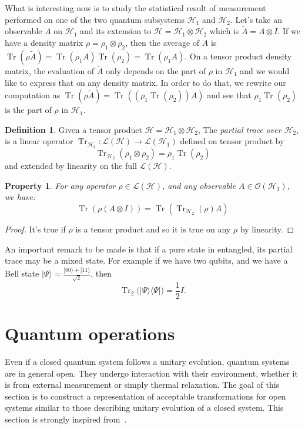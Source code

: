 \documentclass[10pt,a4paper]{report}
\theoremstyle{plain}
\newtheorem{prop}[thm]{Property}
\theoremstyle{definition}
\newtheorem{defn}{Definition}[chapter]
\theoremstyle{remark}
\newcommand{\ket}[1]{|#1\rangle}
\newcommand{\bra}[1]{\langle#1|}
\DeclareMathOperator{\Tr}{Tr}
\begin{document}
What is interesting now is to study the statistical result of measurement performed on one of the two quantum subsystems $\mathcal{H}_1$ and $\mathcal{H}_2$.
Let's take an observable $A$ on $\mathcal{H}_1$ and its extension to
$\mathcal{H} = \mathcal{H}_1 \otimes \mathcal{H}_2$ which is $\tilde A = A
\otimes I$. If we have a density matrix $\rho = \rho_1 \otimes \rho_2$, then the
average of $A$ is $\Tr(\rho \tilde A) = \Tr(\rho_1A)\Tr(\rho_2) = \Tr(\rho_1A)$.
On a tensor product density matrix, the evaluation of $\tilde A$ only depends on
the part of $\rho$ in $\mathcal{H}_1$ and we would like to express that on any
density matrix. In order to do that, we rewrite our computation as
$\Tr(\rho\tilde A) = \Tr((\rho_1\Tr(\rho_2))A)$ and see that
$\rho_1\Tr(\rho_2)$ is the part of $\rho$ in $\mathcal{H}_1$.

\begin{defn}
  Given a tensor product $\mathcal{H} = \mathcal{H}_1 \otimes \mathcal{H}_2$,
  The \emph{partial trace over $\mathcal{H}_2$}, is a linear operator
  $\Tr_{\mathcal{H}_2} : \mathcal{L}(\mathcal{H}) \to
  \mathcal{L}(\mathcal{H}_1)$ defined on tensor product by
  \[\Tr_{\mathcal{H}_2}(\rho_1\otimes \rho_2) = \rho_1 \Tr(\rho_2)\]
  and extended by linearity on the full $\mathcal{L}(\mathcal{H})$.
\end{defn}

\begin{prop}
  For any operator $\rho \in \mathcal{L}(\mathcal{H})$, and any observable
  $A\in\mathcal{O}(\mathcal{H}_1)$, we have:
  \[\Tr(\rho(A \otimes I)) = \Tr(\Tr_{\mathcal{H}_2}(\rho)A)\]
\end{prop}

\begin{proof}
  It's true if $\rho$ is a tensor product and so it is true on any $\rho$ by linearity.
\end{proof}

An important remark to be made is that if a pure state in entangled, its partial
trace may be a mixed state. For example if we have two qubits, and we have a
Bell state $\ket \Psi = \frac{\ket{00} + \ket{11}}{\sqrt 2}$, then
\[\Tr_2\big(\ket \Psi \bra \Psi\big) = \frac 12I.\]


\section{Quantum operations}

Even if a closed quantum system follows a unitary evolution, quantum
systems are in general open. They undergo interaction with their environment, whether it is
from external measurement or simply thermal relaxation. The goal of this section
is to construct a representation of acceptable transformations for open systems
similar to those describing unitary evolution of a closed system.
This section is strongly inspired from~\cite{QCQI}.
\end{document}
